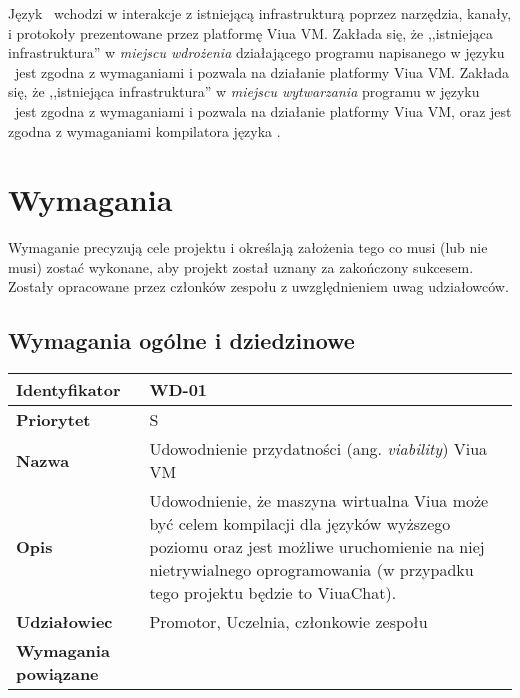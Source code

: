 Język \ViuAct\ wchodzi w interakcje z istniejącą infrastrukturą poprzez narzędzia, kanały, i protokoły
prezentowane przez platformę Viua VM.
Zakłada się, że ,,istniejąca infrastruktura'' w \emph{miejscu wdrożenia} działającego programu napisanego
w języku \ViuAct\ jest zgodna z wymaganiami i pozwala na działanie platformy Viua VM.
Zakłada się, że ,,istniejąca infrastruktura'' w \emph{miejscu wytwarzania} programu w języku \ViuAct\ jest
zgodna z wymaganiami i pozwala na działanie platformy Viua VM, oraz jest zgodna z wymaganiami
kompilatora języka \ViuAct.

\section{Wymagania}

Wymaganie precyzują cele projektu i określają założenia tego co musi (lub nie musi) zostać wykonane, aby
projekt został uznany za zakończony sukcesem. Zostały opracowane przez członków zespołu z uwzględnieniem
uwag udziałowców.

\subsection{Wymagania ogólne i dziedzinowe}

\phantom{}

\begin{tabular}{ | l | l | }
    \hline
    \textbf{Identyfikator} & \parbox[t]{11cm}{WD-01} \\
    \hline
    \textbf{Priorytet} & S \\
    \hline
    \textbf{Nazwa} & Udowodnienie przydatności (ang. \emph{viability}) Viua VM \\
    \hline
    \textbf{Opis} & \parbox[t]{11cm}{
        Udowodnienie, że maszyna wirtualna Viua może być celem kompilacji dla
        języków wyższego poziomu oraz jest możliwe uruchomienie na niej nietrywialnego
        oprogramowania (w przypadku tego projektu będzie to ViuaChat).} \\
    \hline
    \textbf{Udziałowiec} & Promotor, Uczelnia, członkowie zespołu \\
    \hline
    \textbf{Wymagania powiązane} & \phantom{} \\
    \hline
\end{tabular}

\vspace{1em}

